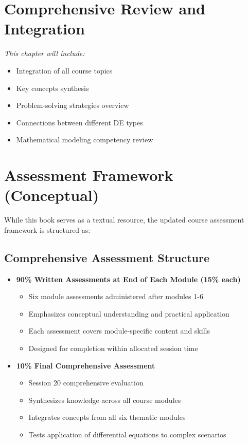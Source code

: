 \documentclass[12pt, letterpaper]{book}
\begin{document}
\chapter{Comprehensive Review and Integration}
\label{chap:session_20}

\textit{This chapter will include:}
\begin{itemize}
    \item Integration of all course topics
    \item Key concepts synthesis
    \item Problem-solving strategies overview
    \item Connections between different DE types
    \item Mathematical modeling competency review
\end{itemize}

\appendix
\chapter{Assessment Framework (Conceptual)}
\label{app:assessment}
While this book serves as a textual resource, the updated course assessment framework is structured as:

\section{Comprehensive Assessment Structure}
\begin{itemize}
    \item \textbf{90\% Written Assessments at End of Each Module (15\% each)}
    \begin{itemize}
        \item Six module assessments administered after modules 1-6
        \item Emphasizes conceptual understanding and practical application
        \item Each assessment covers module-specific content and skills
        \item Designed for completion within allocated session time
    \end{itemize}

    \item \textbf{10\% Final Comprehensive Assessment}
    \begin{itemize}
        \item Session 20 comprehensive evaluation
        \item Synthesizes knowledge across all course modules
        \item Integrates concepts from all six thematic modules
        \item Tests application of differential equations to complex scenarios
    \end{itemize}
\end{itemize}
\end{document}

